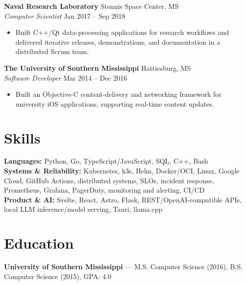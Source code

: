 \documentclass[11pt]{article}
\begin{document}
\textbf{Naval Research Laboratory} \hfill Stennis Space Center, MS\\
\textit{Computer Scientist} \hfill Jan 2017 -- Sep 2018
\begin{itemize}
  \item Built C++/Qt data-processing applications for research workflows and delivered iterative
  releases, demonstrations, and documentation in a distributed Scrum team.
\end{itemize}

\textbf{The University of Southern Mississippi} \hfill Hattiesburg, MS\\
\textit{Software Developer} \hfill Mar 2014 -- Dec 2016
\begin{itemize}
  \item Built an Objective-C content-delivery and networking framework for university iOS
  applications, supporting real-time content updates.
\end{itemize}

\section*{Skills}
\textbf{Languages:} Python, Go, TypeScript/JavaScript, SQL, C++, Bash\\
\textbf{Systems \& Reliability:} Kubernetes, k3s, Helm, Docker/OCI, Linux, Google Cloud, GitHub
Actions, distributed systems, SLOs, incident response, Prometheus, Grafana, PagerDuty, monitoring
and alerting, CI/CD\\
\textbf{Product \& AI:} Svelte, React, Astro, Flask, REST/OpenAI-compatible APIs, local LLM
inference/model serving, Tauri, llama.cpp

\section*{Education}
\textbf{University of Southern Mississippi} --- M.S. Computer Science (2016), B.S. Computer
Science (2015), GPA: 4.0
\end{document}
